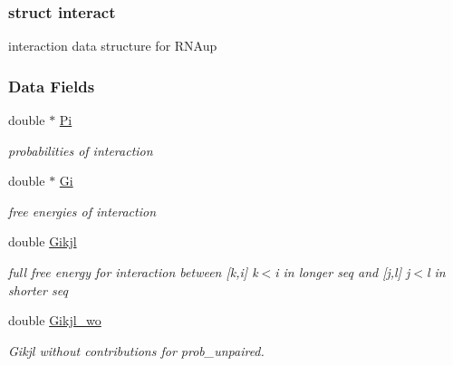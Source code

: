 \subsubsection{struct interact}
interaction data structure for R\+N\+Aup \subsubsection*{Data Fields}
\begin{DoxyCompactItemize}
\item 
\mbox{\label{group__data__structures_a1fc8b3860c083f164daa9712690a3a56}} 
double $\ast$ \hyperlink{group__data__structures_a1fc8b3860c083f164daa9712690a3a56}{Pi}
\begin{DoxyCompactList}\small\item\em probabilities of interaction \end{DoxyCompactList}\item 
\mbox{\label{group__data__structures_a54f8183542fff4c32ab7ace49a16c02c}} 
double $\ast$ \hyperlink{group__data__structures_a54f8183542fff4c32ab7ace49a16c02c}{Gi}
\begin{DoxyCompactList}\small\item\em free energies of interaction \end{DoxyCompactList}\item 
\mbox{\label{group__data__structures_ad58303190f9e085c3ab59890cbf61223}} 
double \hyperlink{group__data__structures_ad58303190f9e085c3ab59890cbf61223}{Gikjl}
\begin{DoxyCompactList}\small\item\em full free energy for interaction between \mbox{[}k,i\mbox{]} k$<$i in longer seq and \mbox{[}j,l\mbox{]} j$<$l in shorter seq \end{DoxyCompactList}\item 
\mbox{\label{group__data__structures_a41793812abae560805414761fec398fe}} 
double \hyperlink{group__data__structures_a41793812abae560805414761fec398fe}{Gikjl\+\_\+wo}
\begin{DoxyCompactList}\small\item\em Gikjl without contributions for prob\+\_\+unpaired. \end{DoxyCompactList}\item 

\end{DoxyCompactItemize}
